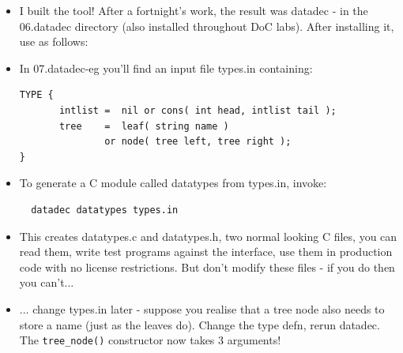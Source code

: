 \documentclass[handout,]{beamer}
\newcommand{\pitem}{\pause \item}
\begin{document}
\begin{frame}[fragile]
    \begin{itemize}
    \item
      I built the tool!  After a fortnight's work, the
      result was \alert{datadec} - in the \alert{06.datadec} directory
      (also installed throughout DoC labs).
      After installing it, use as follows:
    \pitem
      In \alert{07.datadec-eg} you'll find an input file
      \alert{types.in} containing:
      \small
\begin{verbatim}
TYPE {
       intlist =  nil or cons( int head, intlist tail );
       tree    =  leaf( string name )
               or node( tree left, tree right );
}
\end{verbatim}
    \pitem
       To generate a C module called \alert{datatypes} from \alert{types.in},
       invoke:
\begin{verbatim}
  datadec datatypes types.in
\end{verbatim}
    \pitem
       This creates \alert{datatypes.c} and \alert{datatypes.h}, two
       normal looking C files,
       you can read them, write test programs against the interface,
       use them in production code with no license restrictions.
       \pause
       But don't modify these files - if you do then you can't...
    \pitem
       ... change \alert{types.in} later - suppose you realise that
       a tree node also needs to store a name (just as the leaves do).
       Change the type defn, rerun \alert{datadec}.  The \verb+tree_node()+
       constructor now takes 3 arguments!
    \end{itemize}
\end{frame}
\end{document}
